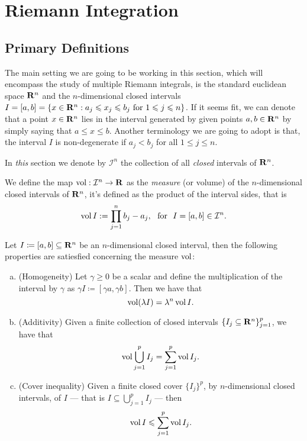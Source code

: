 \section{Riemann Integration}

\subsection{Primary Definitions}

The main setting we are going to be working in this section, which will
encompass the study of multiple Riemann integrals, is the standard euclidean
space \(\mathbf{R}^n\) and the \(n\)-dimensional closed intervals \(I = [a, b] = \{x \in
\mathbf{R}^n : a_j \leqslant x_j \leqslant b_j \text{ for } 1 \leqslant j \leqslant n\}\). If it seems fit,
we can denote that a point \(x \in \mathbf{R}^n\) lies in the interval generated by
given points \(a, b \in \mathbf{R}^n\) by simply saying that \(a \leq x \leq
b\). Another terminology we are going to adopt is that, the interval \(I\) is
non-degenerate if \(a_j < b_j\) for all \(1 \leq j \leq n\).

\begin{notation}
In \emph{this} section we denote by \(\mathcal I^n\) the collection of all
\emph{closed} intervals of \(\mathbf{R}^n\).
\end{notation}

\begin{definition}
\label{def:interval-measure}
We define the map \(\operatorname{vol}: \mathcal I^n \to \mathbf{R}\) as the \emph{measure} (or
volume) of the \(n\)-dimensional closed intervals of \(\mathbf{R}^n\), it's defined as
the product of the interval sides, that is
\[
  \operatorname{vol} I := \prod_{j=1}^n b_j - a_j,
  \ \text{ for }\ I = [a, b] \in \mathcal I^n.
\]
\end{definition}

\begin{corollary}
\label{cor:interval-measure-properties}
Let \(I \coloneqq [a, b] \subseteq \mathbf{R}^n\) be an \(n\)-dimensional closed
interval, then the following properties are satiesfied concerning the measure
\(\operatorname{vol}\):
\begin{enumerate}[(a)]\setlength\itemsep{0em}
\item (Homogeneity) Let \(\gamma \geq 0\) be a scalar and define the
  multiplication of the interval by \(\gamma\) as \(\gamma I \coloneq [\gamma
  a, \gamma b]\). Then we have that
  \[
    \operatorname{vol}(\lambda I) = \lambda^n \operatorname{vol} I.
  \]
\item (Additivity) Given a finite collection of closed intervals \(\{I_{j}
  \subseteq \mathbf{R}^n\}_{j = 1}^p\), we have that
  \[
    \operatorname{vol} \bigcup_{j=1}^p I_j = \sum_{j=1}^p \operatorname{vol} I_j.
  \]
\item (Cover inequality) Given a finite closed cover \(\{I_{j}\}^{p}\), by
  \(n\)-dimensional closed intervals, of \(I\) --- that is \(I \subseteq
  \bigcup_{j=1}^p I_j\) --- then
  \[
    \operatorname{vol} I \leqslant \sum_{j=1}^p \operatorname{vol} I_j.
  \]
\end{enumerate}
\end{corollary}

